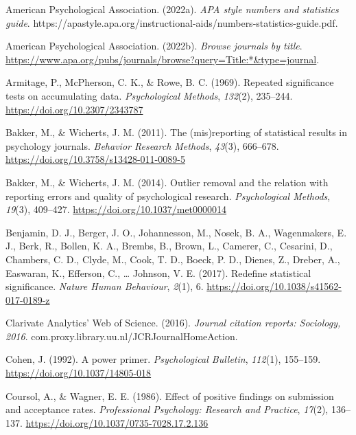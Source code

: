 \documentclass[
  12pt,
]{article}
\begin{document}
\begingroup

\noindent \vspace{-2em} \setlength{\parindent}{-0.4in}
\setlength{\leftskip}{0.4in} \setlength{\parskip}{7pt}

\hypertarget{refs}{}
\leavevmode\hypertarget{ref-APA_numb_stat_guide}{}%
American Psychological Association. (2022a). \emph{APA style numbers and
statistics guide}.
https://apastyle.apa.org/instructional-aids/numbers-statistics-guide.pdf.

\leavevmode\hypertarget{ref-APA_list_journals}{}%
American Psychological Association. (2022b). \emph{Browse journals by
title}.
\url{https://www.apa.org/pubs/journals/browse?query=Title:*\&type=journal}.

\leavevmode\hypertarget{ref-Armitage}{}%
Armitage, P., McPherson, C. K., \& Rowe, B. C. (1969). Repeated
significance tests on accumulating data. \emph{Psychological Methods},
\emph{132}(2), 235--244. \url{https://doi.org/10.2307/2343787}

\leavevmode\hypertarget{ref-Bakker2011}{}%
Bakker, M., \& Wicherts, J. M. (2011). The (mis)reporting of statistical
results in psychology journals. \emph{Behavior Research Methods},
\emph{43}(3), 666--678. \url{https://doi.org/10.3758/s13428-011-0089-5}

\leavevmode\hypertarget{ref-Bakker2014}{}%
Bakker, M., \& Wicherts, J. M. (2014). Outlier removal and the relation
with reporting errors and quality of psychological research.
\emph{Psychological Methods}, \emph{19}(3), 409--427.
\url{https://doi.org/10.1037/met0000014}

\leavevmode\hypertarget{ref-Benjamin}{}%
Benjamin, D. J., Berger, J. O., Johannesson, M., Nosek, B. A.,
Wagenmakers, E. J., Berk, R., Bollen, K. A., Brembs, B., Brown, L.,
Camerer, C., Cesarini, D., Chambers, C. D., Clyde, M., Cook, T. D.,
Boeck, P. D., Dienes, Z., Dreber, A., Easwaran, K., Efferson, C.,
\ldots{} Johnson, V. E. (2017). Redefine statistical significance.
\emph{Nature Human Behaviour}, \emph{2}(1), 6.
\url{https://doi.org/10.1038/s41562-017-0189-z}

\leavevmode\hypertarget{ref-WOS}{}%
Clarivate Analytics' Web of Science. (2016). \emph{Journal citation
reports: Sociology, 2016}. com.proxy.library.uu.nl/JCRJournalHomeAction.

\leavevmode\hypertarget{ref-Cohen}{}%
Cohen, J. (1992). A power primer. \emph{Psychological Bulletin},
\emph{112}(1), 155--159. \url{https://doi.org/10.1037/14805-018}

\leavevmode\hypertarget{ref-Coursol}{}%
Coursol, A., \& Wagner, E. E. (1986). Effect of positive findings on
submission and acceptance rates. \emph{Professional Psychology: Research
and Practice}, \emph{17}(2), 136--137.
\url{https://doi.org/10.1037/0735-7028.17.2.136}
\end{document}
